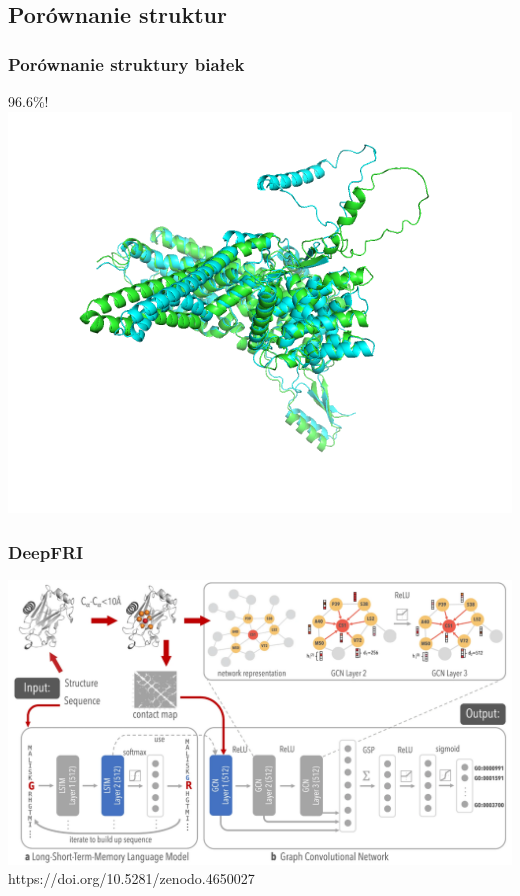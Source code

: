 \documentclass{beamer}
\begin{document}
\subsection{Porównanie struktur}
\begin{frame}
    \frametitle{Porównanie struktury białek}
    96.6\%!
    \includegraphics[scale=0.8]{nalozone.png}
\end{frame}

\begin{frame}
    \frametitle{DeepFRI}
    \includegraphics[scale=0.27]{deepfrischeme.png}
    \scriptsize{https://doi.org/10.5281/zenodo.4650027}
\end{frame}
\end{document}
